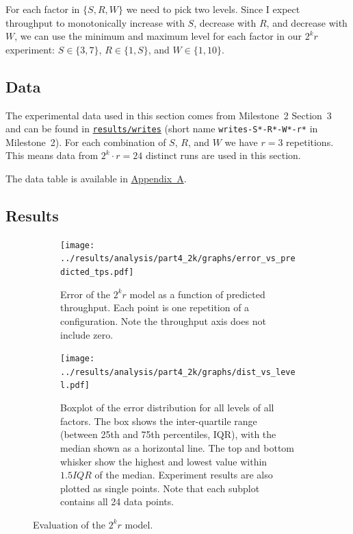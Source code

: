 \documentclass[11pt]{article}
\begin{document}
For each factor in $\{S,R,W\}$ we need to pick two levels. Since I expect throughput to monotonically increase with $S$, decrease with $R$, and decrease with $W$, we can use the minimum and maximum level for each factor in our $2^kr$ experiment: $S \in \{3, 7\}$, $R \in \{1, S\}$, and $W \in \{1, 10\}$.


\subsection{Data}

The experimental data used in this section comes from Milestone~2 Section~3 and can be found in \texttt{\href{https://gitlab.inf.ethz.ch/pungast/asl-fall16-project/tree/master/results/writes}{results/writes}} (short name \texttt{writes-S*-R*-W*-r*} in Milestone~2). For each combination of $S$, $R$, and $W$ we have $r=3$ repetitions. This means data from $2^k \cdot r = 24$ distinct runs are used in this section.

The data table is available in \hyperref[sec:appa]{Appendix~A}.

%

\subsection{Results}

\begin{figure}[h]
\centering
\begin{subfigure}[t]{0.49\textwidth}
\centering
\texttt{[image: ../results/analysis/part4\_2k/graphs/error\_vs\_predicted\_tps.pdf]}
\caption{Error of the $2^kr$ model as a function of predicted throughput. Each point is one repetition of a configuration. Note the throughput axis does not include zero.}
\label{fig:part4:errorvspredicted}
\end{subfigure}
\begin{subfigure}[t]{0.49\textwidth}
\centering
\texttt{[image: ../results/analysis/part4\_2k/graphs/dist\_vs\_level.pdf]}
\caption{Boxplot of the error distribution for all levels of all factors. The box shows the inter-quartile range (between 25th and 75th percentiles, IQR), with the median shown as a horizontal line. The top and bottom whisker show the highest and lowest value within $1.5 IQR$ of the median. Experiment results are also plotted as single points. Note that each subplot contains all 24 data points.}
\label{fig:part4:errordistvslevel}
\end{subfigure}
\caption{Evaluation of the $2^kr$ model.}
\end{figure}
\end{document}
